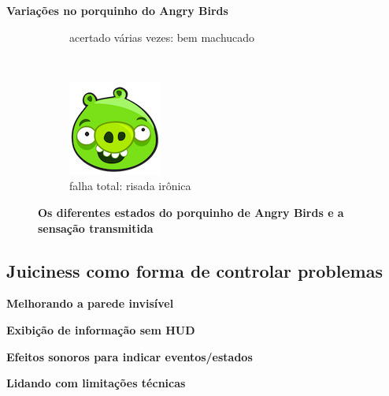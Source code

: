 \expandafter\documentclass\expandafter[table, usenames, svgnames, dvipsnames, \classopts]{beamer}
\begin{document}
\begin{frame}{\textbf{Variações no porquinho do Angry Birds}}
\begin{figure}
\begin{subfigure}[!h]{0.2\paperwidth}
	        \caption{\scriptsize acertado várias vezes: bem machucado}
	    \end{subfigure}
	    ~
		\begin{subfigure}[!h]{0.2\paperwidth}
			\centering
	        \includegraphics[height=0.2\paperheight]{angry-birds-pig5}
	        \caption{\scriptsize falha total: risada irônica}
	    \end{subfigure}

	    \caption{\textbf{Os diferentes estados do porquinho de Angry Birds e a sensação transmitida}}
    \end{figure}

\end{frame}

\subsection{Juiciness como forma de controlar problemas}

\begin{frame}{\textbf{Melhorando a parede invisível}}

\end{frame}

\begin{frame}{\textbf{Exibição de informação sem HUD}}

\end{frame}

\begin{frame}{\textbf{Efeitos sonoros para indicar eventos/estados}}

\end{frame}

\begin{frame}{\textbf{Lidando com limitações técnicas}}


\end{frame}
\end{document}
